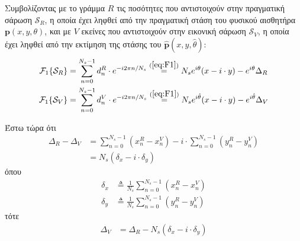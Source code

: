 Συμβολίζοντας με το γράμμα $R$ τις ποσότητες που αντιστοιχούν στην πραγματική
σάρωση $\mathcal{S}_R$, η οποία έχει ληφθεί από την πραγματική στάση του
φυσικού αισθητήρα $\bm{p}(x,y,\theta)$, και με $V$ εκείνες που αντιστοιχούν
στην εικονική σάρωση $\mathcal{S}_V$, η οποία έχει ληφθεί από την εκτίμηση της
στάσης του $\hat{\bm{p}}(x,y,\hat{\theta})$:
\begin{align}
  \mathcal{F}_1\{\mathcal{S}_R\} &= \sum\limits_{n=0}^{N_s-1}d_n^R \cdot e^{-i 2 \pi n/N_s} \stackrel{(\ref{eq:F1})}{=} N_s e^{i\theta}(x-i\cdot y) - e^{i\theta} \Delta_R \label{eq:dne_complex_r} \\
  \mathcal{F}_1\{\mathcal{S}_V\} &= \sum\limits_{n=0}^{N_s-1}d_n^V \cdot e^{-i 2 \pi n/N_s} \stackrel{(\ref{eq:F1})}{=} N_s e^{i\hat{\theta}}(x-i\cdot y) - e^{i\hat{\theta}} \Delta_V \label{eq:dne_complex_v}
\end{align}

Έστω τώρα ότι
\begin{align}
  \Delta_R - \Delta_V &= \sum\limits_{n=0}^{N_s-1}(x_n^R-x_n^V) - i \cdot \sum\limits_{n=0}^{N_s-1}(y_n^R-y_n^V) \nonumber \\
                      &= N_s (\delta_x - i \cdot \delta_y)
\end{align}
όπου
\begin{align}
  \delta_x &\triangleq \frac{1}{N_s}\sum\limits_{n=0}^{N_s-1}(x_n^R-x_n^V) \label{eq:delta_x}\\
  \delta_y &\triangleq \frac{1}{N_s}\sum\limits_{n=0}^{N_s-1}(y_n^R-y_n^V) \label{eq:delta_y}
\end{align}
τότε
\begin{align}
  \Delta_V &= \Delta_R -N_s(\delta_x - i \cdot \delta_y) \label{eq:Delta_V_eq_Delta_R}
\end{align}

